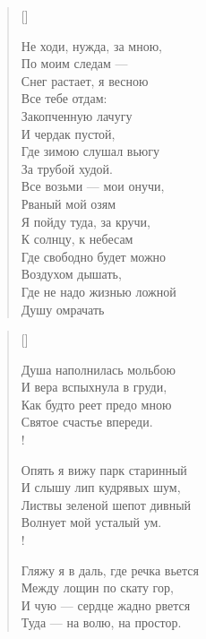 \newpage
\vspace*{0cm}


\settowidth{\versewidth}{Где не надо жизнью ложной}
\begin{verse}[\versewidth]
\begin{altverse}
Не ходи, нужда, за мною,\\
    По моим следам ---\\
Снег растает, я весною\\
    Все тебе отдам:\\
Закопченную лачугу\\
    И чердак пустой,\\
Где зимою слушал вьюгу\\
    За трубой худой.\\
Все возьми --- мои онучи,\\
    Рваный мой озям\ldotst\\
Я пойду туда, за кручи,\\
    К солнцу, к небесам\ldotst\\
Где свободно будет можно\\
    Воздухом дышать,\\
Где не надо жизнью ложной\\
    Душу омрачать\ldotst\\
\end{altverse}
\end{verse}

\newpage
\vspace*{0cm}

\settowidth{\versewidth}{Опять я вижу парк старинный}
\begin{verse}[\versewidth]
\begin{altverse}
Душа наполнилась мольбою\\
    И вера вспыхнула в груди,\\
Как будто реет предо мною\\
    Святое счастье впереди.\\!

Опять я вижу парк старинный\\
    И слышу лип кудрявых шум,\\
Листвы зеленой шепот дивный\\
    Волнует мой усталый ум.\\!

Гляжу я в даль, где речка вьется\\
    Между лощин по скату гор,\\
И чую --- сердце жадно рвется\\
    Туда --- на волю, на простор.
\end{altverse}
\end{verse}

